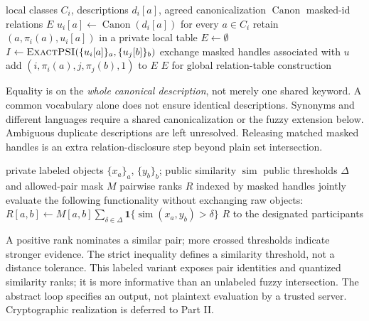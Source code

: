 \documentclass[11pt]{article}
\newcommand{\psiexact}{\textsc{ExactPSI}}
\newcommand{\ind}{\mathbf{1}}
\begin{document}
\begin{algorithm}[H]
\caption{Description-based relation construction using exact PSI}\label{alg:a2}
\small\begin{algorithmic}[1]
\Require local classes $C_i$, descriptions $d_i[a]$, agreed canonicalization $\operatorname{Canon}$
\Ensure masked-id relations $E$
 \State $u_i[a]\gets\operatorname{Canon}(d_i[a])$ for every $a\in C_i$
 \State retain $(a,\pi_i(a),u_i[a])$ in a private local table
\EndFor
\State $E\gets\emptyset$
 \State $I\gets\psiexact(\{u_i[a]\}_a,\{u_j[b]\}_b)$ 
  \State exchange masked handles associated with $u$
   \State add $(i,\pi_i(a),j,\pi_j(b),1)$ to $E$
  \EndIf
 \EndFor
\EndFor
\State \Return $E$ for global relation-table construction
\end{algorithmic}
\smallskip\noindent\small
Equality is on the \emph{whole canonical description}, not merely one shared
keyword. A common vocabulary alone does not ensure identical descriptions.
Synonyms and different languages require a shared canonicalization or the
fuzzy extension below. Ambiguous duplicate descriptions are left unresolved.
Releasing matched masked handles is an extra relation-disclosure step beyond
plain set intersection.
\end{algorithm}

\clearpage
\begin{algorithm}[H]
\caption{Labeled fuzzy PSI with a threshold ladder (abstract primitive)}\label{alg:fpsabstract}
\small\begin{algorithmic}[1]
\Require private labeled objects $\{x_a\}_a$, $\{y_b\}_b$; public similarity $\operatorname{sim}$
\Require public thresholds $\Delta$ and allowed-pair mask $M$
\Ensure pairwise ranks $R$ indexed by masked handles
 \State jointly evaluate the following functionality without exchanging raw objects:
  \State $R[a,b]\gets M[a,b]\sum_{\delta\in\Delta}\ind\{\operatorname{sim}(x_a,y_b)>\delta\}$
 \EndFor
 \State \Return $R$ to the designated participants
\EndProcedure
\end{algorithmic}
\smallskip\noindent\small
A positive rank nominates a similar pair; more crossed thresholds indicate
stronger evidence. The strict inequality defines a similarity threshold,
not a distance tolerance. This labeled variant exposes pair identities and
quantized similarity ranks; it is more informative than an unlabeled fuzzy
intersection. The abstract loop specifies an output, not plaintext evaluation
by a trusted server. Cryptographic realization is deferred to Part II.
\end{algorithm}
\end{document}
